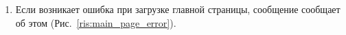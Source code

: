 \documentclass{../includes/TechDoc}
\begin{document}
\begin{enumerate}
        \item Если возникает ошибка при загрузке главной страницы, сообщение сообщает об этом (Рис.~\ref{ris:main_page_error}).
        \begin{figure}[h]
            \begin{center}
                \begin{minipage}[h]{0.3\linewidth}

\end{minipage}
\end{center}
\end{figure}
\end{enumerate}
\end{document}

